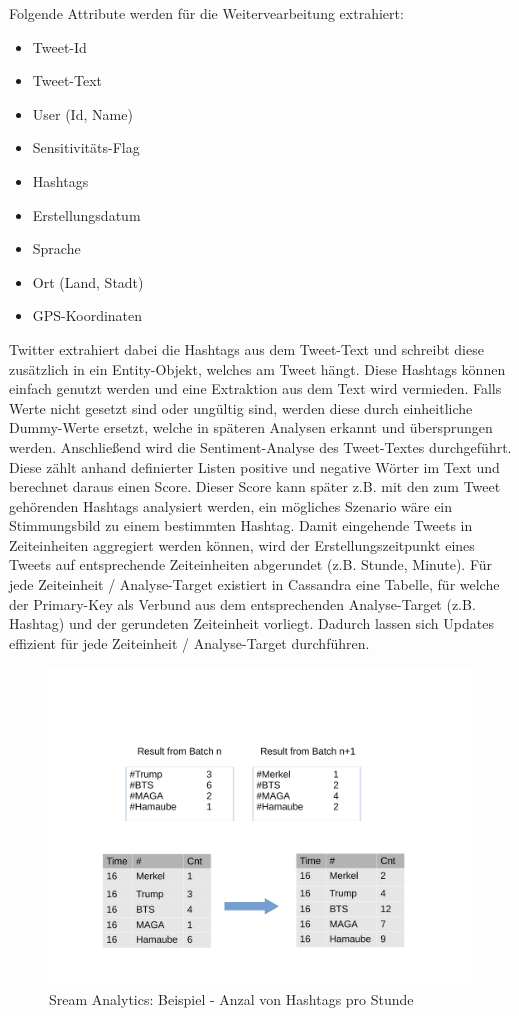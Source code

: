 Folgende Attribute werden für die Weitervearbeitung extrahiert:
\begin{itemize}
	\item Tweet-Id
	\item Tweet-Text
	\item User (Id, Name)
	\item Sensitivitäts-Flag 
	\item Hashtags
	\item Erstellungsdatum
	\item Sprache
	\item Ort (Land, Stadt)
	\item GPS-Koordinaten
\end{itemize}

Twitter extrahiert dabei die Hashtags aus dem Tweet-Text und schreibt diese zusätzlich in ein Entity-Objekt, welches am Tweet hängt.
Diese Hashtags können einfach genutzt werden und eine Extraktion aus dem Text wird vermieden.
Falls Werte nicht gesetzt sind oder ungültig sind, werden diese durch einheitliche Dummy-Werte ersetzt, welche in späteren Analysen erkannt und übersprungen werden.
Anschließend wird die Sentiment-Analyse des Tweet-Textes durchgeführt. Diese zählt anhand definierter Listen positive und negative Wörter im Text und berechnet daraus einen Score. Dieser Score kann später z.B. mit den zum Tweet gehörenden Hashtags analysiert werden, ein mögliches Szenario wäre ein Stimmungsbild zu einem bestimmten Hashtag.
Damit eingehende Tweets in Zeiteinheiten aggregiert werden können,
wird der Erstellungszeitpunkt eines Tweets auf entsprechende Zeiteinheiten abgerundet (z.B. Stunde, Minute). Für jede Zeiteinheit / Analyse-Target existiert in Cassandra eine Tabelle, für welche der Primary-Key als Verbund aus dem entsprechenden Analyse-Target (z.B. Hashtag) und der gerundeten Zeiteinheit vorliegt.
Dadurch lassen sich Updates effizient für jede Zeiteinheit / Analyse-Target durchführen.

\begin{figure}[htbp!]
	\centering
	\includegraphics[width=1.1\textwidth]{pics/analytics/example}
	\caption{Sream Analytics: Beispiel - Anzal von Hashtags pro Stunde}
\end{figure}






